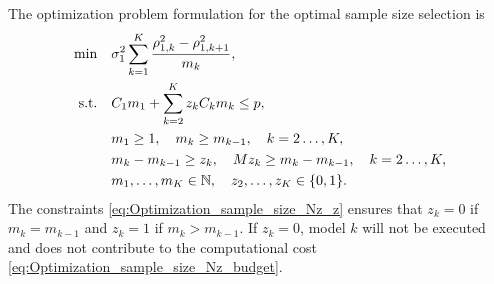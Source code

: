 The optimization problem formulation for the optimal sample size selection is
\begin{subequations}\label{eq:Optimization_sample_size_Nz}
    \begin{align}
    \min \quad &\sigma_1^2  \sum_{k=1}^K \frac{ \rho_{1,k}^2 - \rho_{1,k+1}^2}{m_k},   \\
       \text{s.t.}\quad &  C_1 m_1 + \sum_{k=2}^K z_k C_k m_k \le p,       \label{eq:Optimization_sample_size_Nz_budget}  \\
                                & m_1\ge 1,\quad  m_k \ge m_{k-1}, \quad k=2\ldots,K,\\
                                & m_k - m_{k-1} \ge z_k, \quad M z_k \ge m_k - m_{k-1},  \quad k=2\ldots,K,  \label{eq:Optimization_sample_size_Nz_z}  \\
                                &m_1,\ldots, m_K\in \mathbb{N}, \quad z_2 ,\ldots, z_K\in \{0,1\}.
    \end{align}
\end{subequations}
The constraints \eqref{eq:Optimization_sample_size_Nz_z} ensures that $z_k = 0$ if $m_k = m_{k-1}$ and 
$z_k = 1$ if $m_k >  m_{k-1}$. If $z_k = 0$, model $k$ will not be executed and does not contribute to the 
computational cost \eqref{eq:Optimization_sample_size_Nz_budget}.




